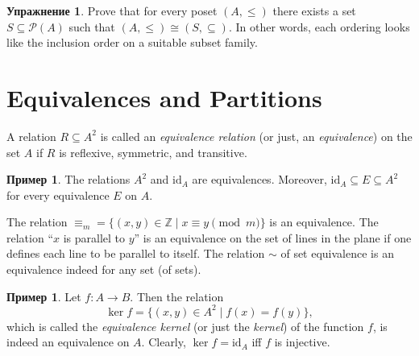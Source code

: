 \documentclass[12pt,notitlepage]{article}
\theoremstyle{plain}
\theoremstyle{definition}
\newtheorem{exc}[thm]{Упражнение}
\newtheorem{exm}[thm]{Пример}
\theoremstyle{plain}
\newcommand{\Z}{\mathbb{Z}}
\newcommand{\sbs}{\subseteq}
\newcommand{\mP}{\mathcal{P}}
\newcommand{\id}{\mathrm{id}}
\newcommand{\1}{\mathbf{1}}
\newcommand{\0}{\mathbf{0}}
\begin{document}
\begin{exc}
	Prove that for every poset $(A, \leq)$ there exists a set $S \sbs \mP(A)$ such that $(A, \leq) \cong (S, {\sbs})$. In other words, each ordering looks like the inclusion order on a suitable subset family.
\end{exc}

\section{Equivalences and Partitions}

A relation $R \sbs A^2$ is called an \emph{equivalence relation} (or just, an \emph{equivalence}) on the set $A$ if $R$ is reflexive, symmetric, and transitive.

\begin{exm}
	The relations $A^2$ and $\id_A$ are equivalences. Moreover, $\id_A \sbs E \sbs A^2$ for every equivalence $E$ on $A$.
	
	The relation $\equiv_m = \{ (x,y) \in \Z \mid  x \equiv y \pmod m \}$ is an equivalence. The relation ``$x$ is parallel to $y$'' is an equivalence on the set of lines in the plane if one defines each line to be parallel to itself. The relation ${\sim}$ of set equivalence is an equivalence indeed for any set (of sets).
\end{exm}

\begin{exm}
	Let $f\colon A \to B$. Then the relation $$\ker f = \{(x,y) \in A^2 \mid f(x) = f(y)\},$$ which is called the \emph{equivalence kernel} (or just the \emph{kernel}) of the function $f$, is indeed an equivalence on $A$. Clearly, $\ker f = \id_A$ iff $f$ is injective.
\end{exm}
\end{document}
